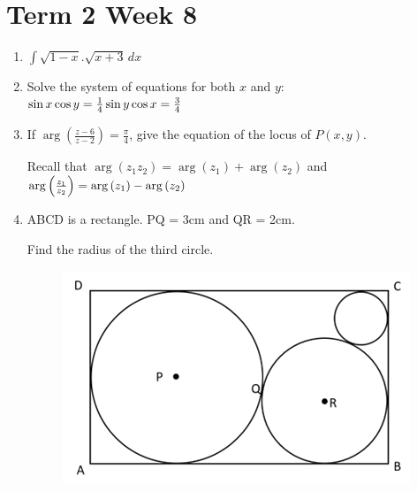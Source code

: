 \documentclass[../main.tex]{subfiles}
\begin{document}
\section*{Term 2 Week 8}
\begin{enumerate}[itemsep=1cm]
    \item 
    \(\int \sqrt{1-x}.\sqrt{x+3}\,dx\)

    \item 
    Solve the system of equations for both \(x\) and \(y\):\\
    $
    \sin{x}\cos{y}=\frac{1}{4}\\
    \sin{y}\cos{x}=\frac{3}{4}
    $
    
    \item
    If \(\arg{(\frac{z-6}{z-2})}=\frac{\pi}{4}\), give the equation of the locus of \(P(x,y)\).
    
    Recall that \(\arg{(z_1z_2)}=\arg{(z_1)}+\arg{(z_2)}\) and \(\arg{\Bigl(\frac{z_1}{z_2}\Bigr)}=\arg{(z_1)}-\arg{(z_2)}\)

    \item
    ABCD is a rectangle. PQ = 3cm and QR = 2cm.

    Find the radius of the third circle.
    
    \begin{figure}[H]
        \centering
        \includegraphics{images/t2w8q4.png}
    \end{figure}
   

    \end{enumerate}
\end{document}
